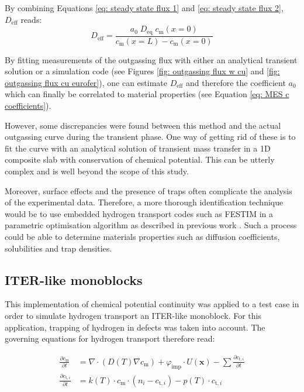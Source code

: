 By combining Equations \ref{eq: steady state flux 1} and \ref{eq: steady state flux 2}, $D_\mathrm{eff}$ reads:
\begin{equation}
    D_\mathrm{eff} = \frac{a_0 \; D_\mathrm{eq} \; c_\mathrm{m}(x=0) }{c_\mathrm{m}(x=L) - c_\mathrm{m}(x=0)}
\end{equation}

By fitting measurements of the outgassing flux with either an analytical transient solution or a simulation code (see Figures \ref{fig: outgassing flux w cu} and \ref{fig: outgassing flux cu eurofer}), one can estimate $D_\mathrm{eff}$ and therefore the coefficient $a_0$ which can finally be correlated to material properties (see Equation \ref{eq: MES c coefficients}).

However, some discrepancies were found between this method and the actual outgassing curve during the transient phase.
One way of getting rid of these is to fit the curve with an analytical solution of transient mass transfer in a 1D composite slab with conservation of chemical potential.
This can be utterly complex and is well beyond the scope of this study.

Moreover, surface effects and the presence of traps often complicate the analysis of the experimental data.
Therefore, a more thorough identification technique would be to use embedded hydrogen transport codes such as FESTIM in a parametric optimisation algorithm as described in previous work .
Such a process could be able to determine materials properties such as diffusion coefficients, solubilities and trap densities.

\subsection{ITER-like monoblocks}

This implementation of chemical potential continuity was applied to a test case in order to simulate hydrogen transport an ITER-like monoblock.
For this application, trapping of hydrogen in defects was taken into account.
The governing equations for hydrogen transport therefore read:

\begin{subequations}
    \begin{align}
        \frac{\partial c_\mathrm{m}}{\partial t} &=\nabla \cdot\left(D(T) \nabla c_\mathrm{m}\right) + \varphi_\mathrm{imp} \cdot U(\textbf{x}) -\sum \frac{\partial c_{\mathrm{t}, i}}{\partial t} \\
        \frac{\partial c_{\mathrm{t}, i}}{\partial t} &=k(T) \cdot c_\mathrm{m} \cdot\left(n_{i}-c_{\mathrm{t}, i}\right)-p(T) \cdot c_{\mathrm{t}, i}
    \end{align}
\end{subequations}

